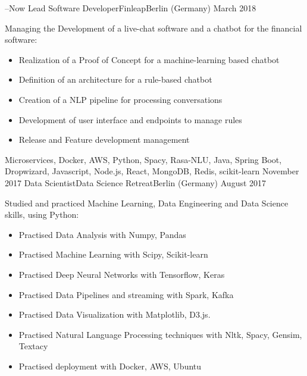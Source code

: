 %
%
%
\begin{experiences}
 \experience
    {--Now}       {Lead Software Developer}{Finleap}{Berlin (Germany)}
    {March 2018}  {Managing the Development of a live-chat software and a chatbot for the financial software: 
                      \begin{itemize}
                      \item Realization of a Proof of Concept for a machine-learning based chatbot
					  \item Definition of an architecture for a rule-based chatbot	
                      \item Creation of a NLP pipeline for processing conversations 
                      \item Development of user interface and endpoints to manage rules
                      \item Release and Feature development management  	
                      \end{itemize}
                    }
                    {Microservices, Docker, AWS, Python, Spacy, Rasa-NLU, Java, Spring Boot, Dropwizard, Javascript, Node.js, React, MongoDB, Redis, scikit-learn}
  \emptySeparator
  \experience
    {November 2017}   {Data Scientist}{Data Science Retreat}{Berlin (Germany)}
    {August 2017}  {Studied and practiced Machine Learning, Data Engineering and Data Science skills, using Python: 
                      \begin{itemize}
                      \item Practised Data Analysis with Numpy, Pandas
                      \item Practised Machine Learning with Scipy, Scikit-learn
					   \item Practised Deep Neural Networks with Tensorflow, Keras
					   \item Practised Data Pipelines and streaming with Spark, Kafka
					   \item Practised Data Visualization with Matplotlib, D3.js. 
					   \item Practised Natural Language Processing techniques with Nltk, Spacy, Gensim, Textacy
					   \item Practised deployment with Docker, AWS, Ubuntu

\end{itemize}}
\end{experiences}
